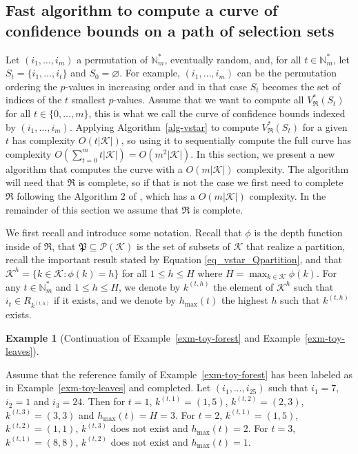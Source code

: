 \documentclass[
  11pt,
  a4paper,
]{article}
\theoremstyle{plain}
\theoremstyle{plain}
\theoremstyle{plain}
\theoremstyle{definition}
\theoremstyle{definition}
\newtheorem{example}{Example}[section]
\theoremstyle{remark}
\begin{document}
\subsection{Fast algorithm to compute a curve of confidence bounds on a
path of selection sets}\label{sec-fast-curve}

Let \((i_1,\dotsc, i_m)\) a permutation of \(\mathbb{N}_m^*\),
eventually random, and, for all \(t\in\mathbb{N}_m^*\), let
\(S_t=\{i_1,\dotsc,i_t\}\) and \(S_0=\varnothing\). For example,
\((i_1,\dotsc, i_m)\) can be the permutation ordering the \(p\)-values
in increasing order and in that case \(S_t\) becomes the set of indices
of the \(t\) smallest \(p\)-values. Assume that we want to compute all
\(V^*_{\mathfrak{R}}(S_t)\) for all \(t\in\{ 0,\dotsc,m\}\), this is
what we call the curve of confidence bounds indexed by
\((i_1,\dotsc, i_m)\). Applying  Algorithm~\ref{alg-vstar}  to compute
\(V^*_{\mathfrak{R}}(S_t)\) for a given \(t\) has complexity
\(O(t|\mathcal{K}|)\), so using it to sequentially compute the full
curve has complexity
\(O\left(\sum_{t=0}^m t |\mathcal{K}|\right)=O\left(m^2|\mathcal{K}|\right)\).
In this section, we present a new algorithm that computes the curve with
a \(O\left(m|\mathcal{K}|\right)\) complexity. The algorithm will need
that \(\mathfrak{R}\) is complete, so if that is not the case we first
need to complete \(\mathfrak{R}\) following the Algorithm 2 of
\citet{MR4178188}, which has a \(O(m|\mathcal{K}|)\) complexity. In the
remainder of this section we assume that \(\mathfrak{R}\) is complete.

We first recall and introduce some notation. Recall that \(\phi\) is the
depth function inside of \(\mathfrak{R}\), that
\(\mathfrak P \subseteq \mathcal P(\mathcal{K})\) is the set of subsets
of \(\mathcal{K}\) that realize a partition, recall the important result
stated by Equation \eqref{eq_vstar_Qpartition}, and that
\(\mathcal{K}^h=\{ k\in\mathcal{K}: \phi(k)=h  \}\) for all
\(1\leq h\leq H\) where \(H=\max_{k\in\mathcal{K}}\phi(k)\). For any
\(t\in\mathbb{N}_m^*\) and \(1\leq h\leq H\), we denote by \(k^{(t,h)}\)
the element of \(\mathcal{K}^h\) such that \(i_t\in R_{k^{(t,h)}}\) if
it exists, and we denote by \(h_{\max}(t)\) the highest \(h\) such that
\(k^{(t,h)}\) exists.

\begin{example}[Continuation of Example~\ref{exm-toy-forest} and
Example~\ref{exm-toy-leaves}]\protect\hypertarget{exm-kth}{}\label{exm-kth}

Assume that the reference family of Example~\ref{exm-toy-forest} has
been labeled as in Example~\ref{exm-toy-leaves} and completed. Let
\((i_1,\dotsc, i_{25})\) such that \(i_1=7\), \(i_2=1\) and \(i_3=24\).
Then for \(t=1\), \(k^{(t,1)}=(1,5)\), \(k^{(t,2)}=(2,3)\),
\(k^{(t,3)}=(3,3)\) and \(h_{\max}(t)=H=3\). For \(t=2\),
\(k^{(t,1)}=(1,5)\), \(k^{(t,2)}=(1,1)\), \(k^{(t,3)}\) does not exist
and \(h_{\max}(t)=2\). For \(t=3\), \(k^{(t,1)}=(8,8)\), \(k^{(t,2)}\)
does not exist and \(h_{\max}(t)=1\).

\end{example}
\end{document}
